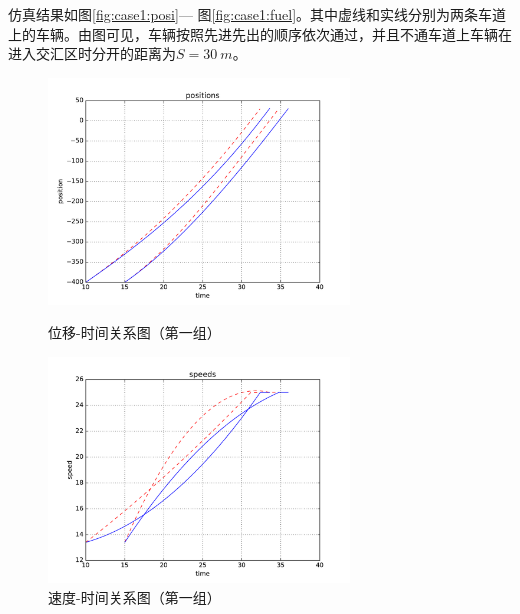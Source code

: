仿真结果如图\ref{fig:case1:posi}--- 图\ref{fig:case1:fuel}。其中虚线和实线分别为两条车道上的车辆。由图可见，车辆按照先进先出的顺序依次通过，并且不通车道上车辆在进入交汇区时分开的距离为$S=\SI{30}{m}$。
\begin{figure}[htbp]
\begin{minipage}{0.48\textwidth}
  \centering
  \includegraphics[height=6cm]{figures/sim_case1/posi.pdf}
  \caption{位移-时间关系图（第一组）}
  \label{fig:case1:posi}
\end{minipage}\hfill
\begin{minipage}{0.48\textwidth}
  \centering
  \includegraphics[height=6cm]{figures/sim_case1/speed.pdf}
  \caption{速度-时间关系图（第一组）}
  \label{fig:case1:speed}
\end{minipage}
\end{figure}
